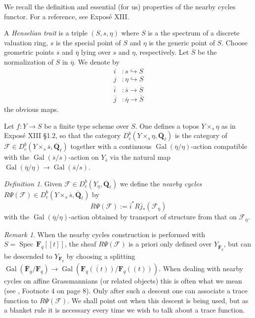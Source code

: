 \documentclass[reqno]{amsart}
\numberwithin{equation}{section}
\newcommand{\F}{\mathbf{F}}
\newcommand{\Q}{\mathbf{Q}}
\newcommand{\Gal}{\operatorname{Gal}}
\newcommand{\ol}[1]{\overline{#1}}
\newcommand{\Cal}[1]{\mathcal{#1}}
\newcommand{\co}{\colon}
\DeclareMathOperator{\Spec}{Spec\,}
\theoremstyle{remark}
\newtheorem{remark}[thm]{Remark}
\newtheorem{defn}[thm]{Definition}
\numberwithin{equation}{section}
\begin{document}
We recall the definition and essential (for us) properties of the nearby cycles functor. For a reference, see \cite{Del73} Expos\'{e} XIII. 

A \emph{Henselian trait} is a triple $(S, s,\eta)$ where $S$ is a the spectrum of a discrete valuation ring, $s$ is the special point of $S$ and $\eta$ is the generic point of $S$. Choose geometric points $\ol{s}$ and $\ol{\eta}$ lying over $s$ and $\eta$, respectively. Let $\ol{S}$ be the normalization of $S$ in $\ol{\eta}$. We denote by 
\begin{align*}
i &\co s \hookrightarrow S \\
j &\co \eta \hookrightarrow S \\
\ol{i} &\co \ol{s} \rightarrow \ol{S} \\
\ol{j} &\co \ol{\eta} \rightarrow \ol{S}
\end{align*}
the obvious maps. 

Let $f \co Y \rightarrow S$ be a finite type scheme over $S$. One defines a topos $Y \times_s \eta$ as in \cite{Del73} Expos\'{e} XIII \S 1.2, so that the category $D_c^b(Y \times_s \eta, \ol{\Q}_{\ell})$ is the category of $\Cal{F} \in D_c^b(Y \times_s \ol{s}, \ol{\Q}_{\ell})$ together with a continuous $\Gal(\ol{\eta}/\eta)$-action compatible with the $\Gal(\ol{s}/s)$-action on $Y_{\ol{s}}$ via the natural map $\Gal(\ol{\eta}/\eta) \rightarrow \Gal(\ol{s}/s)$.


\begin{defn}
Given $\Cal{F} \in D_c^b(Y_{\eta}, \ol{\Q}_{\ell})$ we define the \emph{nearby cycles} $R\Psi(\Cal{F}) \in D_c^b(Y \times_s \ol{s}, \ol{\Q}_{\ell})$ by 
\[
R\Psi(\Cal{F})  := \ol{i}^* R\ol{j}_* (\Cal{F}_{\ol{\eta}})
\]
with the $\Gal(\ol{\eta}/\eta)$-action obtained by transport of structure from that on $\Cal{F}_{\ol{\eta}}$. 
\end{defn}


\begin{remark}\label{rem: nearby cycles descent}
When the nearby cycles construction is performed with $S  = \Spec \F_q[\![t]]$, the sheaf $R\Psi(\Cal{F})$ is a priori only defined over $Y_{\ol{\F}_q}$, but can be descended to $Y_{\F_q}$ by choosing a splitting $\Gal(\ol{\F}_q/\F_q) \rightarrow \Gal(\ol{\F_q((t))}/\F_q((t)))$. When dealing with nearby cycles on affine Grassmannians (or related objects) this is often what we mean (see \cite{Gaits01}, Footnote 4 on page 8). Only after such a descent one can associate a trace function to $R\Psi(\Cal{F})$. We shall point out when this descent is being used, but as a blanket rule it is necessary every time we wish to talk about a trace function. 
\end{remark}
\end{document}
